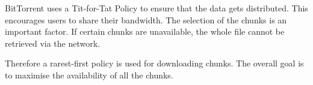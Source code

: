 BitTorrent uses a Tit-for-Tat Policy to ensure that the data gets distributed.
This encourages users to share their bandwidth.
The selection of the chunks is an important factor.
If certain chunks are unavailable,
the whole file cannot be retrieved via the network.

Therefore a rarest-first policy is used for downloading chunks.
The overall goal is to maximise the availability of all the chunks.

